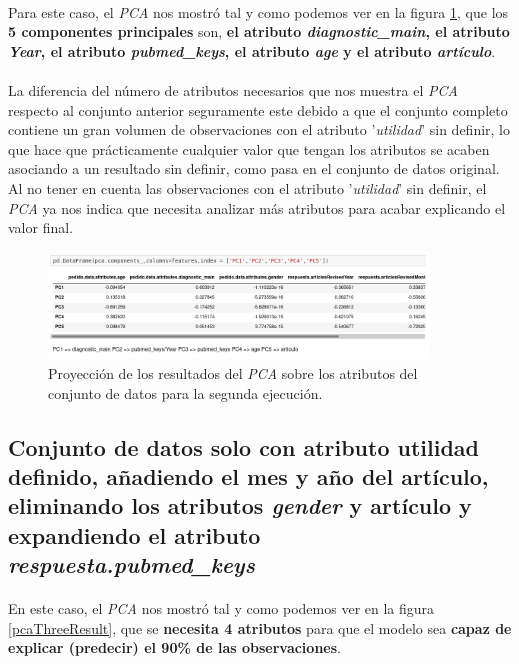 \paragraph{}
Para este caso, el \textit{PCA} nos mostró tal y como podemos ver en la figura \ref{pcaTwoAtributos}, que los \textbf{5 componentes principales} son, \textbf{el atributo \textit{diagnostic\_main}, el atributo \textit{Year}, el atributo \textit{pubmed\_keys}, el atributo \textit{age} y el atributo \textit{artículo}}.

\paragraph{}
La diferencia del número de atributos necesarios que nos muestra el \textit{PCA} respecto al conjunto anterior seguramente este debido a que el conjunto completo contiene un gran volumen de observaciones con el atributo '\textit{utilidad}' sin definir, lo que hace que prácticamente cualquier valor que tengan los atributos se acaben asociando a un resultado sin definir, como pasa en el conjunto de datos original. Al no tener en cuenta las observaciones con el atributo '\textit{utilidad}' sin definir, el \textit{PCA} ya nos indica que necesita analizar más atributos para acabar explicando el valor final.

\begin{figure}[!htb]
  \centering
    \includegraphics[width=0.9\textwidth]{images/resultados_procesado_de_datos_pca2_atributos.png}
    \caption{Proyección de los resultados del \textit{PCA} sobre los atributos del conjunto de datos para la segunda ejecución.}
  \label{pcaTwoAtributos}
\end{figure}

\subsection{Conjunto de datos solo con atributo utilidad definido, añadiendo el mes y año del artículo, eliminando los atributos \textit{gender} y artículo y expandiendo el atributo \textit{respuesta.pubmed\_keys}}
\label{result:pca_case3}
\paragraph{}
En este caso, el \textit{PCA} nos mostró tal y como podemos ver en la figura \ref{pcaThreeResult}, que se \textbf{necesita 4 atributos} para que el modelo sea \textbf{capaz de explicar (predecir) el 90\% de las observaciones}.

